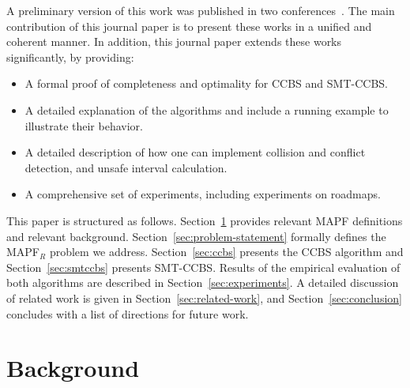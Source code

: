 \documentclass[review]{elsarticle}
\newcommand\konstantin[1]{\nb{\textbf{Konstantin:}}{red}{#1}}
\newcommand\roni[1]{\nb{\textbf{Roni:}}{green}{#1}}
\newcommand\pavel[1]{\nb{\textbf{Pavel:}}{blue}{#1}}
\newcommand{\ccbs}{\ac{CCBS}\xspace}
\newcommand{\mapfr}{\ac{MAPF}$_R$\xspace}
\newcommand{\smtccbs}{SMT-CCBS\xspace}
\newcommand{\mapf}{\ac{MAPF}\xspace}
\newcommand{\inconflict}{\textsc{InConflict}\xspace}
\begin{document}
A preliminary version of this work was published in two conferences~\cite{andreychuk2019multi,DBLP:conf/socs/Surynek19}.  
The main contribution of this journal paper is to present these works in a unified and coherent manner. In addition, this journal paper extends these works significantly, by providing:
\begin{itemize}
    \item A formal proof of completeness and optimality for \ccbs and \smtccbs.
    \item A detailed explanation of the algorithms and include a running example to illustrate their behavior. 
    \item A detailed description of how one can implement collision and conflict detection, and unsafe interval calculation.
    \item A comprehensive set of experiments, including experiments on roadmaps. 
\end{itemize}


This paper is structured as follows. 
Section~\ref{sec:background} provides relevant \mapf definitions and relevant background. 
Section~\ref{sec:problem-statement} formally defines the \mapfr problem we address. 
Section~\ref{sec:ccbs} presents the \ccbs algorithm and Section~\ref{sec:smtccbs} presents \smtccbs. Results of the empirical evaluation of both algorithms are described in Section~\ref{sec:experiments}. 
A detailed discussion of related work is given in Section~\ref{sec:related-work}, 
and Section~\ref{sec:conclusion} concludes with a list of directions for future work. 


\section{Background}
\label{sec:background}
\end{document}
